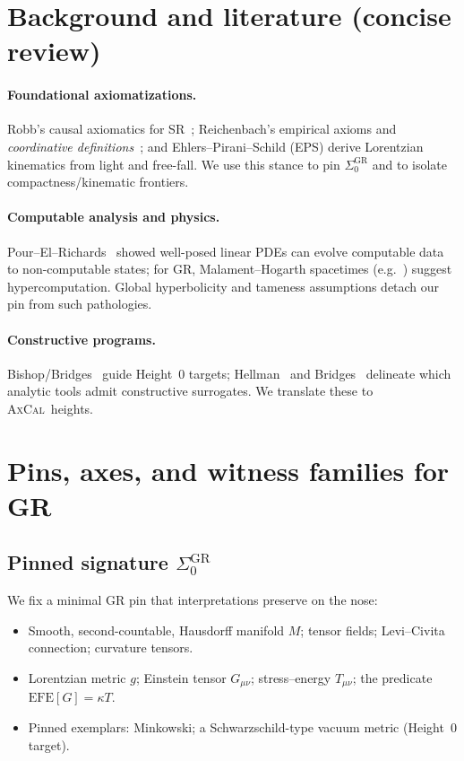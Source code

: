 \documentclass[11pt]{article}
\theoremstyle{definition}
\theoremstyle{remark}
\newcommand{\SigmaZero}{\Sigma_{0}}
\newcommand{\AxCal}{\textsc{AxCal}}
\newcommand{\EFE}{\mathrm{EFE}}
\begin{document}
\section{Background and literature (concise review)}
\paragraph{Foundational axiomatizations.}
Robb's causal axiomatics for SR~\cite{Robb1914}; Reichenbach's empirical axioms and \emph{coordinative definitions}~\cite{Reichenbach1969}; and Ehlers--Pirani--Schild (EPS) \cite{EPS1972} derive Lorentzian kinematics from light and free-fall. We use this stance to pin $\SigmaZero^{\mathrm{GR}}$ and to isolate compactness/kinematic frontiers.

\paragraph{Computable analysis and physics.}
Pour--El--Richards~\cite{PourElRichards1989} showed well-posed linear PDEs can evolve computable data to non-computable states; for GR, Malament--Hogarth spacetimes (e.g.\ \cite{EtesiNemeti2002}) suggest hypercomputation. Global hyperbolicity and tameness assumptions detach our pin from such pathologies.

\paragraph{Constructive programs.}
Bishop/Bridges~\cite{BishopBridges1985} guide Height~0 targets; Hellman~\cite{Hellman1998} and Bridges~\cite{BridgesReply1995} delineate which analytic tools admit constructive surrogates. We translate these to \AxCal\ heights.

\section{Pins, axes, and witness families for GR}
\subsection{Pinned signature \texorpdfstring{$\SigmaZero^{\mathrm{GR}}$}{Σ0^GR}}
We fix a minimal GR pin that interpretations preserve on the nose:
\begin{itemize}
\item Smooth, second-countable, Hausdorff manifold $M$; tensor fields; Levi--Civita connection; curvature tensors.
\item Lorentzian metric $g$; Einstein tensor $G_{\mu\nu}$; stress--energy $T_{\mu\nu}$; the predicate $\EFE[G]=\kappa T$.
\item Pinned exemplars: Minkowski; a Schwarzschild-type vacuum metric (Height~0 target).
\end{itemize}
\end{document}
